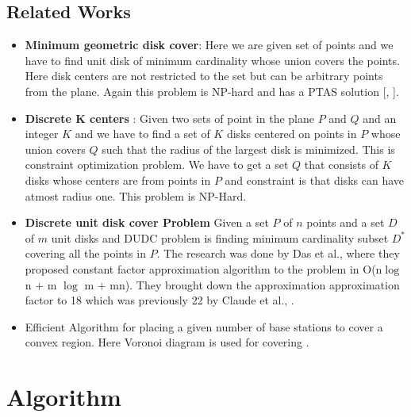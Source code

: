 \documentclass[12pt,a4wide]{report}
\theoremstyle{plain}
\theoremstyle{definition}
\theoremstyle{remark}
\begin{document}
\section{Related Works }
\begin{itemize}
                 \item \textbf{Minimum geometric disk cover}: Here we are given set of points and we have to find 
                              unit disk of minimum cardinality whose union covers the points. Here disk 
                              centers are not restricted to the set but can be arbitrary points from the plane.
                              Again this problem is NP-hard \cite{FMS81} and has a PTAS solution [\cite{T91}, \cite{DW85}].
                 \item \textbf{Discrete K centers }: Given two sets of point in the plane $P$ and $Q$ 
                              and an integer $K$ and we have to find a set of $K$ disks centered on points in $P$ whose union covers
                              $Q$ such that the radius of the largest disk is minimized. This is constraint optimization problem.
                              We have to get a set $Q$ that consists of $K$ disks whose centers are from points in $P$ and constraint is that
                              disks can have atmost radius one. This problem is NP-Hard.
                 \item \textbf{Discrete unit disk cover Problem} Given a set $P$ of $n$ points and a set $D$ of $m$ unit disks and DUDC problem is finding 
                              minimum cardinality subset $D^{\ast}$ covering all the points in $P$\cite{GRALB12}. The research was 
                              done by Das et al., where they proposed constant factor approximation algorithm to the problem in 
                              O(n$\log$ n + m $\log$ m $+$ mn). They brought down the approximation approximation factor to 18 which 
                              was previously 22 by Claude et al., \cite{FGRSR10}.
                  \item Efficient Algorithm for placing a given number of base stations to cover a convex region. Here Voronoi 
                          diagram is used for covering \cite{GSSB}.
                 \end{itemize}
\chapter{Algorithm}
\end{document}
